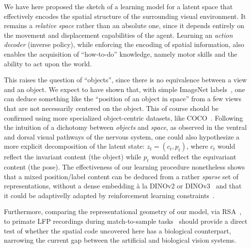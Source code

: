 \documentclass{article}
\begin{document}
We have here proposed the sketch of a learning model for a latent space that effectively encodes the spatial structure of the surrounding visual environment. It remains a \emph{relative space} rather than an absolute one, since it depends entirely on the movement and displacement capabilities of the agent. 
Learning an \emph{action decoder} (inverse policy), while enforcing the encoding of spatial information, also enables the acquisition of ``how-to-do'' knowledge, namely motor skills and the ability to act upon the world.  

This raises the question of ``objects'', since there is no equivalence between a view and an object. We expect to have shown that, with simple ImageNet labels~\cite{russakovsky2015imagenet}, one can deduce something like the ``position of an object in space'' from a few views that are not necessarily centered on the object. This of course should be confirmed using more specialized object-centric datasets, like  COCO~\cite{lin2014microsoft}.
Following the intuition of a dichotomy between \emph{objects} and \emph{space}, as observed in the ventral and dorsal visual pathways of the nervous system, one could also hypothesize a more explicit decomposition of the latent state: $z_t = (c_t, p_t)$, where $c_t$ would reflect the invariant content (the object) while $p_t$ would reflect the equivariant content (the pose).
The effectiveness of our learning procedure nonetheless shows that a mixed position/label content can be deduced from a rather \emph{sparse} set of representations, without a dense embedding \`a la DINOv2 or DINOv3~\cite{oquab2024dinov2,simeoni2025dinov3} and that it could be adaptivelly adapted by reinforcement learning constraints~\cite{damasse2018reinforcement}.

Furthermore, comparing the representational geometry of our model, via RSA~\cite{kriegeskorte2008representational}, to primate LFP recordings during match-to-sample tasks~\cite{fuster1971neuron,miller1996neural} should provide a direct test of whether the spatial code uncovered here has a biological counterpart, narrowing the current gap between the artificial and biological vision systems.



\end{document}
